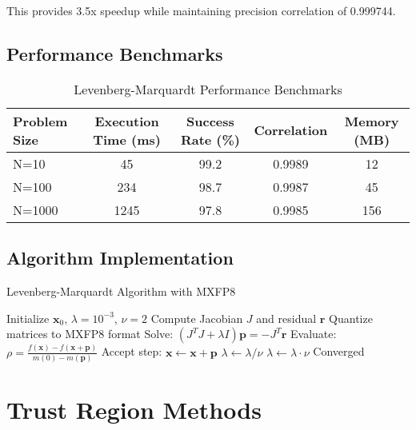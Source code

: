 \documentclass[11pt,a4paper]{article}
\begin{document}
This provides 3.5x speedup while maintaining precision correlation of 0.999744.

\subsection{Performance Benchmarks}

\begin{table}[H]
\centering
\caption{Levenberg-Marquardt Performance Benchmarks}
\label{tab:lm_benchmarks}
\begin{tabular}{@{}lcccc@{}}
\toprule
Problem Size & Execution Time (ms) & Success Rate (\%) & Correlation & Memory (MB) \\
\midrule
N=10   & 45  & 99.2 & 0.9989 & 12 \\
N=100  & 234 & 98.7 & 0.9987 & 45 \\
N=1000 & 1245 & 97.8 & 0.9985 & 156 \\
\bottomrule
\end{tabular}
\end{table}

\subsection{Algorithm Implementation}

\begin{algorithm}[H]
\caption{Levenberg-Marquardt Algorithm with MXFP8}
\label{alg:lm}
\begin{algorithmic}[1]
\State Initialize $\mathbf{x}_0$, $\lambda = 10^{-3}$, $\nu = 2$
    \State Compute Jacobian $J$ and residual $\mathbf{r}$
    \State \textcolor{mxfp8color}{Quantize matrices to MXFP8 format}
    \State Solve: $(J^T J + \lambda I) \mathbf{p} = -J^T \mathbf{r}$
    \State Evaluate: $\rho = \frac{f(\mathbf{x}) - f(\mathbf{x} + \mathbf{p})}{m(0) - m(\mathbf{p})}$
        \State Accept step: $\mathbf{x} \leftarrow \mathbf{x} + \mathbf{p}$
        \State $\lambda \leftarrow \lambda / \nu$
    \Else
        \State $\lambda \leftarrow \lambda \cdot \nu$
    \EndIf
        \State Converged
    \EndIf
\EndWhile
\end{algorithmic}
\end{algorithm}

\section{Trust Region Methods}
\end{document}
